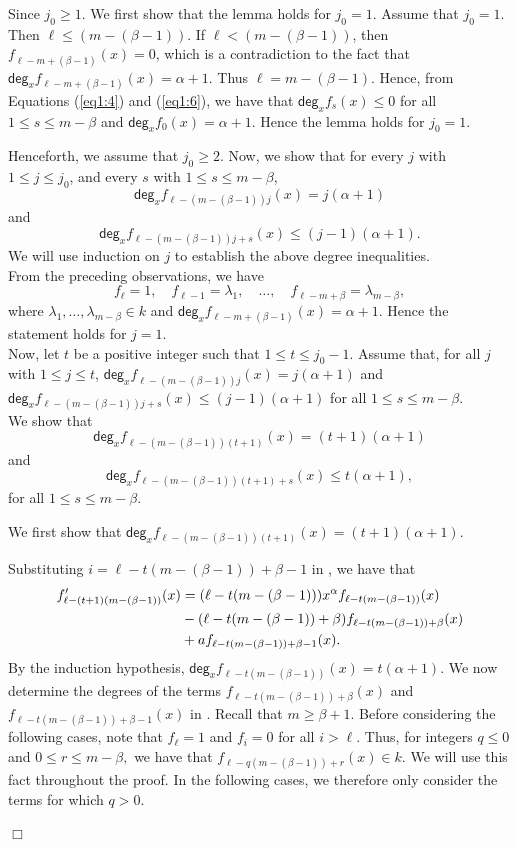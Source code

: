 \documentclass[12pt,reqno]{amsart}
\renewcommand{\deg}{\mathsf{deg}}
\renewcommand{\leq}{\leqslant}
\renewcommand{\geq}{\geqslant}
\numberwithin{thm}{section}
\theoremstyle{definition}
\numberwithin{equation}{thm}
\renewenvironment{proof}{\par\noindent {\em Proof:}}{\hfill$\Box$\medskip}
\theoremstyle{plain}
\begin{document}
\begin{proof}
\medskip

\noindent Since $j_0\geq 1$. We first show that the lemma holds for $j_0=1$.
Assume that $j_0=1$. Then $\ell\leq (m-(\beta-1))$. If $\ell<(m-(\beta-1))$, then $f_{\ell-m+(\beta-1)}(x)=0$, 
which is a contradiction to the fact that $\deg_x f_{\ell-m+(\beta-1)}(x)=\alpha+1$. 
Thus $\ell=m-(\beta-1)$. Hence, from Equations (\ref{eq1:4}) and (\ref{eq1:6}), we have that 
$\deg_x f_s(x)\leq0$ for all $1\leq s\leq m-\beta$ and 
$\deg_x f_0(x)=\alpha+1$. Hence the lemma holds for $j_0=1$.

\medskip

\noindent Henceforth, we assume that $j_0\geq2$. Now, we show that for every 
$j$ with $1\leq j\leq j_0$, and every $s$ with $1\leq s\leq m-\beta$,
\[
\deg_x f_{\ell-(m-(\beta-1))j}(x)=j(\alpha+1)
\]
and
\[
\deg_x f_{\ell-(m-(\beta-1))j+s}(x)\leq (j-1)(\alpha+1).
\]
\noindent We will use induction on $j$ to establish the above degree inequalities.\\
From the preceding observations, we have
\[
f_\ell=1,\quad
f_{\ell-1}=\lambda_1,\quad
\dots,\quad
f_{\ell-m+\beta}=\lambda_{m-\beta},
\]
where $\lambda_1,\dots,\lambda_{m-\beta}\in k$ and $\deg_x f_{\ell-m+(\beta-1)}(x)=\alpha+1$. Hence the statement holds for $j=1$.\\
Now, let $t$ be a positive integer such that $1\leq t\leq j_0-1$. Assume that, for all $j$ with $1\leq j\leq t$,
$\deg_x f_{\ell-(m-(\beta-1))j}(x)=j(\alpha+1)$
and
$\deg_x f_{\ell-(m-(\beta-1))j+s}(x)\leq (j-1)(\alpha+1)$
for all $1\leq s\leq m-\beta$.\\
We show that $$\deg_x f_{\ell-(m-(\beta-1))(t+1)}(x)=(t+1)(\alpha+1)$$ and $$\deg_x f_{\ell-(m-(\beta-1))(t+1)+s}(x)\leq t(\alpha+1),$$ for all $1\leq s\leq m-\beta$.

\medskip
\noindent We first show that $\deg_x f_{\ell-(m-(\beta-1))(t+1)}(x)=(t+1)(\alpha+1)$.

\medskip
\noindent Substituting $i=\ell-t(m-(\beta-1))+\beta-1$ in , we have that
\begin{align}\label{eq1:7}
f'_{\ell-(t+1)(m-(\beta-1))}(x)&=(\ell-t(m-(\beta-1)))x^\alpha f_{\ell-t(m-(\beta-1))}(x)\notag\\
&-(\ell-t(m-(\beta-1))+\beta)f_{\ell-t(m-(\beta-1))+\beta}(x)\notag \\
&+af_{\ell-t(m-(\beta-1))+\beta-1}(x).
\end{align}
By the induction hypothesis, $\deg_x f_{\ell-t(m-(\beta-1))}(x)=t(\alpha+1)$. We now determine the degrees of the terms $f_{\ell-t(m-(\beta-1))+\beta}(x)$ and $f_{\ell-t(m-(\beta-1))+\beta-1}(x)$ in . Recall that $m\geq \beta+1.$
Before considering the following cases, note that $f_{\ell}=1$ and $f_i=0$ for all $i>\ell.$ Thus, for integers $q\leq 0$ and $0\leq r\leq m-\beta,$ we have that $f_{\ell-q(m-(\beta-1))+r}(x)\in k.$ We will use this fact throughout the proof. In the following cases, we therefore only consider the terms for which $q>0.$


\end{proof}
\end{document}
